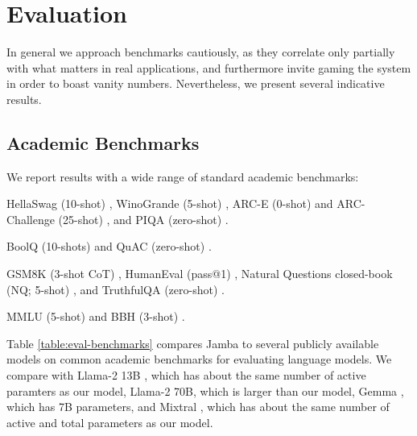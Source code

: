 \documentclass{article}
\def\jamba{Jamba\xspace}
\begin{document}
\vspace{-5pt}
\section{Evaluation} \label{sec:evaluation}
\vspace{-5pt}

In general we approach benchmarks cautiously, as they correlate only partially with what matters in real applications, and furthermore invite gaming the system in order to boast vanity numbers. Nevertheless, we present several indicative results.

\vspace{-5pt}
\subsection{Academic Benchmarks} \label{sec:evaluation-benchmarks}

We report results with a wide range of  standard academic benchmarks:  

\begin{description}[itemsep=1pt,parsep=1pt,topsep=1pt] 
    \item[Common sense reasoning:] HellaSwag (10-shot) \cite{zellers2019hellaswag}, WinoGrande (5-shot) \cite{sakaguchi2020winogrande}, ARC-E (0-shot) and ARC-Challenge (25-shot) \cite{clark2018think}, and PIQA (zero-shot) \cite{bisk2020piqa}.
    \item[Reading Comprehension:] BoolQ (10-shots) \cite{clark2019boolq} and QuAC (zero-shot) \cite{choi2018quac}.
    \item[Others:] GSM8K (3-shot CoT) \cite{cobbe2021training}, HumanEval (pass@1)  \cite{chen2021evaluating}, Natural Questions closed-book (NQ; 5-shot) \cite{kwiatkowski2019natural}, and  TruthfulQA (zero-shot) \cite{lin-etal-2022-truthfulqa}. 
    \item[Aggregate benchmarks:] MMLU (5-shot) \cite{hendrycks2020measuring} and BBH (3-shot) \cite{suzgun2023challenging}. 
\end{description}

Table \ref{table:eval-benchmarks} compares \jamba to several publicly available models on common academic benchmarks for evaluating language models. We compare with Llama-2 13B \cite{touvron2023llama}, which has about the same number of active paramters as our model, Llama-2 70B, which is larger than our model, Gemma \cite{team2024gemma}, which has 7B parameters, and Mixtral \cite{jiang2024mixtral}, which has about the same number of active and total parameters as our model. 
\end{document}
